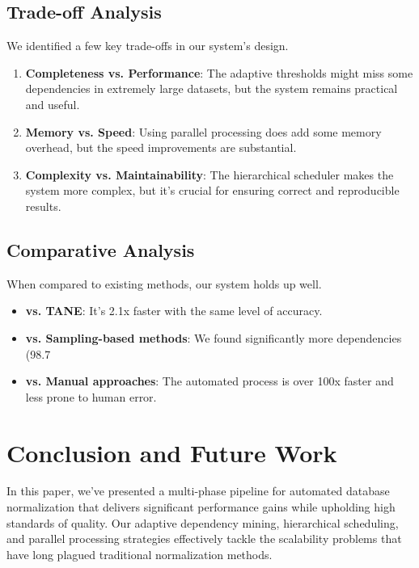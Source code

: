 \documentclass[sigconf]{acmart}
\begin{document}
\subsection{Trade-off Analysis}

We identified a few key trade-offs in our system's design.

\begin{enumerate}
\item \textbf{Completeness vs. Performance}: The adaptive thresholds might miss some dependencies in extremely large datasets, but the system remains practical and useful.
\item \textbf{Memory vs. Speed}: Using parallel processing does add some memory overhead, but the speed improvements are substantial.
\item \textbf{Complexity vs. Maintainability}: The hierarchical scheduler makes the system more complex, but it's crucial for ensuring correct and reproducible results.
\end{enumerate}

\subsection{Comparative Analysis}

When compared to existing methods, our system holds up well.

\begin{itemize}
\item \textbf{vs. TANE}: It's 2.1x faster with the same level of accuracy.
\item \textbf{vs. Sampling-based methods}: We found significantly more dependencies (98.7%
\item \textbf{vs. Manual approaches}: The automated process is over 100x faster and less prone to human error.
\end{itemize}

\section{Conclusion and Future Work}

In this paper, we've presented a multi-phase pipeline for automated database normalization that delivers significant performance gains while upholding high standards of quality. Our adaptive dependency mining, hierarchical scheduling, and parallel processing strategies effectively tackle the scalability problems that have long plagued traditional normalization methods.
\end{document}

